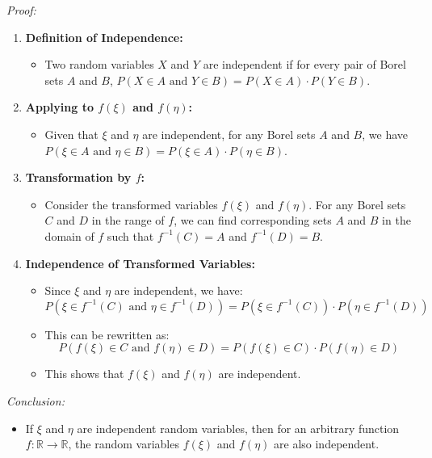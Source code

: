 \textit{Proof:}
\begin{enumerate}
    \item \textbf{Definition of Independence:}
          \begin{itemize}
              \item Two random variables \(X\) and \(Y\) are independent if for every pair of Borel sets \(A\) and \(B\), \(P(X \in A \text{ and } Y \in B) = P(X \in A) \cdot P(Y \in B)\).
          \end{itemize}

    \item \textbf{Applying to \(f(\xi)\) and \(f(\eta)\):}
          \begin{itemize}
              \item Given that \(\xi\) and \(\eta\) are independent, for any Borel sets \(A\) and \(B\), we have \(P(\xi \in A \text{ and } \eta \in B) = P(\xi \in A) \cdot P(\eta \in B)\).
          \end{itemize}

    \item \textbf{Transformation by \(f\):}
          \begin{itemize}
              \item Consider the transformed variables \(f(\xi)\) and \(f(\eta)\). For any Borel sets \(C\) and \(D\) in the range of \(f\), we can find corresponding sets \(A\) and \(B\) in the domain of \(f\) such that \(f^{-1}(C) = A\) and \(f^{-1}(D) = B\).
          \end{itemize}

    \item \textbf{Independence of Transformed Variables:}
          \begin{itemize}
              \item Since \(\xi\) and \(\eta\) are independent, we have:
                    \[ P(\xi \in f^{-1}(C) \text{ and } \eta \in f^{-1}(D)) = P(\xi \in f^{-1}(C)) \cdot P(\eta \in f^{-1}(D)) \]
              \item This can be rewritten as:
                    \[ P(f(\xi) \in C \text{ and } f(\eta) \in D) = P(f(\xi) \in C) \cdot P(f(\eta) \in D) \]
              \item This shows that \(f(\xi)\) and \(f(\eta)\) are independent.
          \end{itemize}
\end{enumerate}

\textit{Conclusion:}
\begin{itemize}
    \item If \(\xi\) and \(\eta\) are independent random variables, then for an arbitrary function \(f : \mathbb{R} \rightarrow \mathbb{R}\), the random variables \(f(\xi)\) and \(f(\eta)\) are also independent.
\end{itemize}

